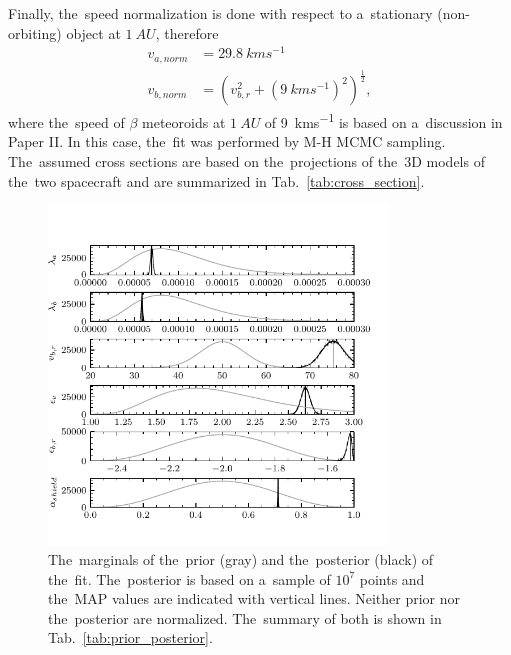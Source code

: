 Finally, the~speed normalization is done with respect to a~stationary (non-orbiting) object at $\SI{1}{AU}$, therefore
\begin{equation}\begin{split}
    v_{a,norm} & = \SI{29.8}{kms^{-1}} \\
    v_{b,norm} & = \left( v_{b,r}^2 + \left(\SI{9}{kms^{-1}}\right)^2 \right)^\frac{1}{2},
\end{split}\end{equation}
where the~speed of $\beta$ meteoroids at $\SI{1}{AU}$ of \SI{9}{kms^{-1}} is based on a~discussion in Paper II. In this case, the~fit was performed by M-H MCMC sampling. The~assumed cross sections are based on the~projections of the~3D models \citep{psp_model,solo_model} of the~two spacecraft and are summarized in Tab.~\ref{tab:cross_section}.

\begin{figure}[ht]
 	\centering
 	\includegraphics[width=9cm]{figures/both_shield.pdf}
 	\caption{The~marginals of the~prior (gray) and the~posterior (black) of the~fit. The~posterior is based on a~sample of $10^7$ points and the~MAP values are indicated with vertical lines. Neither prior nor the~posterior are normalized. The~summary of both is shown in Tab.~\ref{tab:prior_posterior}.}
 	\label{fig:fit_posteriors}
\end{figure}

